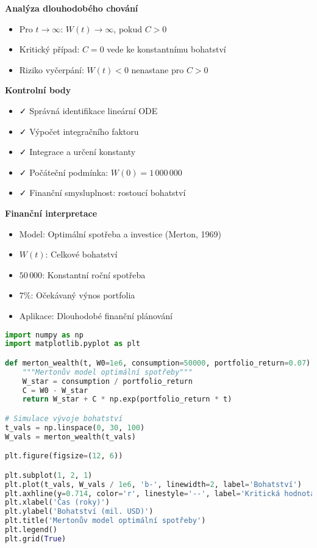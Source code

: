 \begin{example}
\noindent\textbf{Analýza dlouhodobého chování}
\begin{itemize}
\item Pro $t \to \infty$: $W(t) \to \infty$, pokud $C > 0$
\item Kritický případ: $C = 0$ vede ke konstantnímu bohatství
\item Riziko vyčerpání: $W(t) < 0$ nenastane pro $C > 0$
\end{itemize}

\noindent\textbf{Kontrolní body}
\begin{itemize}
\item ✓ Správná identifikace lineární ODE
\item ✓ Výpočet integračního faktoru
\item ✓ Integrace a určení konstanty
\item ✓ Počáteční podmínka: $W(0) = 1\,000\,000$
\item ✓ Finanční smysluplnost: rostoucí bohatství
\end{itemize}

\noindent\textbf{Finanční interpretace}
\begin{itemize}
\item Model: Optimální spotřeba a investice (Merton, 1969)
\item $W(t)$: Celkové bohatství
\item $50\,000$: Konstantní roční spotřeba
\item $7\%$: Očekávaný výnos portfolia
\item Aplikace: Dlouhodobé finanční plánování
\end{itemize}

\begin{lstlisting}[language=Python, caption={Implementace Mertonova modelu v Pythonu}, label={lst:merton}]
import numpy as np
import matplotlib.pyplot as plt

def merton_wealth(t, W0=1e6, consumption=50000, portfolio_return=0.07):
    """Mertonův model optimální spotřeby"""
    W_star = consumption / portfolio_return
    C = W0 - W_star
    return W_star + C * np.exp(portfolio_return * t)

# Simulace vývoje bohatství
t_vals = np.linspace(0, 30, 100)
W_vals = merton_wealth(t_vals)

plt.figure(figsize=(12, 6))

plt.subplot(1, 2, 1)
plt.plot(t_vals, W_vals / 1e6, 'b-', linewidth=2, label='Bohatství')
plt.axhline(y=0.714, color='r', linestyle='--', label='Kritická hodnota')
plt.xlabel('Čas (roky)')
plt.ylabel('Bohatství (mil. USD)')
plt.title('Mertonův model optimální spotřeby')
plt.legend()
plt.grid(True)


\end{lstlisting}
\end{example}
